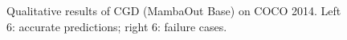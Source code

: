 \begin{figure}[t]
\begin{tabular}{ccccccccccccc}
\end{tabular}
\caption{Qualitative results of CGD (MambaOut Base) on COCO 2014. Left 6: accurate predictions; right 6: failure cases.}
\label{fig:qualitative}
\end{figure}